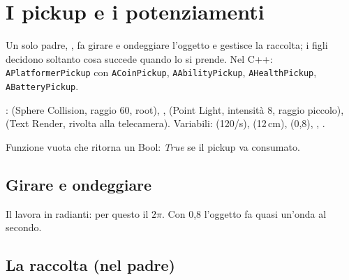 \section{I pickup e i potenziamenti}\label{sec:pickup}

Un solo padre, , fa girare e ondeggiare l'oggetto e gestisce la raccolta; i figli decidono soltanto cosa succede quando lo si prende. Nel C++: \texttt{APlatformerPickup} con \texttt{ACoinPickup}, \texttt{AAbilityPickup}, \texttt{AHealthPickup}, \texttt{ABatteryPickup}.

\begin{ricetta}
  \item {}:  (Sphere Collision, raggio 60, root), ,  (Point Light, intensità 8, raggio piccolo),  (Text Render, rivolta alla telecamera). Variabili:  (120\textdegree/s),  (12\,cm),  (0,8), , .
  \item Funzione vuota  che ritorna un Bool: \emph{True} se il pickup va consumato.
\end{ricetta}

\subsection{Girare e ondeggiare}

\begin{bpgraph}
\end{bpgraph}

Il  lavora in radianti: per questo il $2\pi$. Con  0,8 l'oggetto fa quasi un'onda al secondo.

\subsection{La raccolta (nel padre)}

